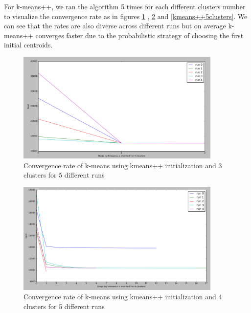 For k-means++, we ran the algorithm 5 times for each different clusters number to visualize the convergence rate as in figures \ref{kmeans++3clusters} , \ref{kmeans++4clusters} and \ref{kmeans++5clusters}. We can see that the rates are also diverse across different runs but on average k-means++ converges faster due to the probabilistic 
strategy of choosing the first initial centroids.

\begin{figure}[!htb]
\centering
\includegraphics[width=0.9\textwidth]{shots/kmeans++3clusters.png}
\caption{ Convergence rate of k-means using kmeans++ initialization and 3 clusters for 5 different runs   }
\label{kmeans++3clusters}
\end{figure}

\begin{figure}[!htb]
\centering
\includegraphics[width=0.9\textwidth]{shots/kmeans++4clusters.png}
\caption{Convergence rate of k-means using kmeans++ initialization and 4 clusters for 5 different runs  }
\label{kmeans++4clusters}
\end{figure}

